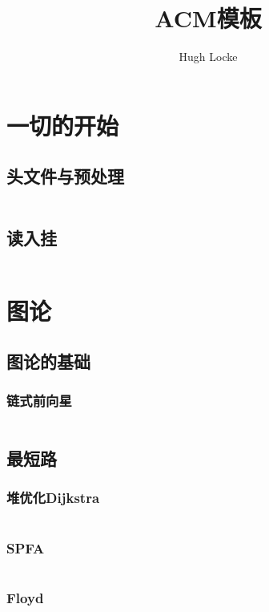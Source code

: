 \documentclass[a4paper,11pt]{article}
\author{Hugh Locke}
\title{ACM模板}
\begin{document}
 
\maketitle %
\newpage %

\tableofcontents %
\newpage
\section{一切的开始} %
\subsection{头文件与预处理} %
\inputminted[breaklines]{c++}{其他/start.cpp} %
\subsection{读入挂} %
\inputminted[breaklines]{c++}{其他/读入挂.cpp} %
\section{图论} %

\subsection{图论的基础} %
\subsubsection{链式前向星} %
\inputminted[breaklines]{c++}{图论/init.cpp} %

\subsection{最短路} %
\subsubsection{堆优化Dijkstra} %
\inputminted[breaklines]{c++}{图论/Dijkstra.cpp} %
\subsubsection{SPFA} %
\inputminted[breaklines]{c++}{图论/SPFA.cpp} %
\subsubsection{Floyd} %
\inputminted[breaklines]{c++}{图论/Floyd.cpp} %
\end{document}
